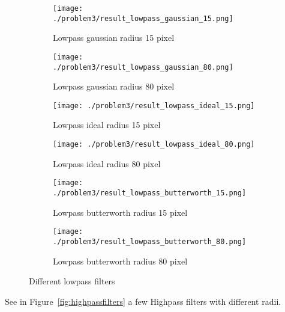 \documentclass[a4paper]{scrartcl}
\begin{document}
\begin{figure}[H]
    \centering
    \begin{subfigure}[t]{0.4\textwidth}
      \texttt{[image: ./problem3/result\_lowpass\_gaussian\_15.png]}
        \caption{Lowpass gaussian radius 15 pixel}
    \end{subfigure}
    \begin{subfigure}[t]{0.4\textwidth}
      \texttt{[image: ./problem3/result\_lowpass\_gaussian\_80.png]}
        \caption{Lowpass gaussian radius 80 pixel}
    \end{subfigure}
    \begin{subfigure}[t]{0.4\textwidth}
      \texttt{[image: ./problem3/result\_lowpass\_ideal\_15.png]}
        \caption{Lowpass ideal radius 15 pixel}
    \end{subfigure}
    \begin{subfigure}[t]{0.4\textwidth}
      \texttt{[image: ./problem3/result\_lowpass\_ideal\_80.png]}
        \caption{Lowpass ideal radius 80 pixel}
    \end{subfigure}
    \begin{subfigure}[t]{0.4\textwidth}
      \texttt{[image: ./problem3/result\_lowpass\_butterworth\_15.png]}
        \caption{Lowpass butterworth radius 15 pixel}
    \end{subfigure}
    \begin{subfigure}[t]{0.4\textwidth}
      \texttt{[image: ./problem3/result\_lowpass\_butterworth\_80.png]}
        \caption{Lowpass butterworth radius 80 pixel}
    \end{subfigure}

    \caption{Different lowpass filters}
    \label{fig:lowpassfilters}
\end{figure}


See in Figure~\ref{fig:highpassfilters} a few Highpass filters with different radii. %
\end{document}
